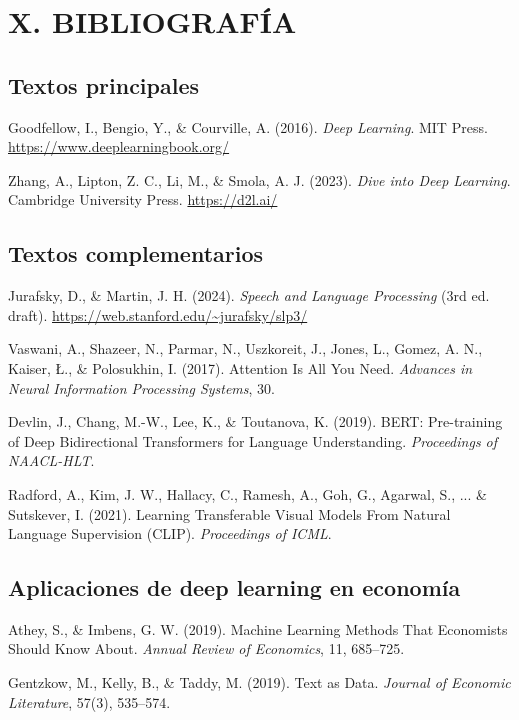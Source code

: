 \documentclass[11pt,a4paper]{article}
\begin{document}
\section*{X. BIBLIOGRAF\'IA}

\subsection*{Textos principales}

Goodfellow, I., Bengio, Y., \& Courville, A. (2016). \textit{Deep Learning}. MIT Press. \url{https://www.deeplearningbook.org/}

Zhang, A., Lipton, Z. C., Li, M., \& Smola, A. J. (2023). \textit{Dive into Deep Learning}. Cambridge University Press. \url{https://d2l.ai/}

\subsection*{Textos complementarios}

Jurafsky, D., \& Martin, J. H. (2024). \textit{Speech and Language Processing} (3rd ed. draft). \url{https://web.stanford.edu/~jurafsky/slp3/}

Vaswani, A., Shazeer, N., Parmar, N., Uszkoreit, J., Jones, L., Gomez, A. N., Kaiser, \L., \& Polosukhin, I. (2017). Attention Is All You Need. \textit{Advances in Neural Information Processing Systems}, 30.

Devlin, J., Chang, M.-W., Lee, K., \& Toutanova, K. (2019). BERT: Pre-training of Deep Bidirectional Transformers for Language Understanding. \textit{Proceedings of NAACL-HLT}.

Radford, A., Kim, J. W., Hallacy, C., Ramesh, A., Goh, G., Agarwal, S., ... \& Sutskever, I. (2021). Learning Transferable Visual Models From Natural Language Supervision (CLIP). \textit{Proceedings of ICML}.

\subsection*{Aplicaciones de deep learning en econom\'ia}

Athey, S., \& Imbens, G. W. (2019). Machine Learning Methods That Economists Should Know About. \textit{Annual Review of Economics}, 11, 685--725.

Gentzkow, M., Kelly, B., \& Taddy, M. (2019). Text as Data. \textit{Journal of Economic Literature}, 57(3), 535--574.
\end{document}
